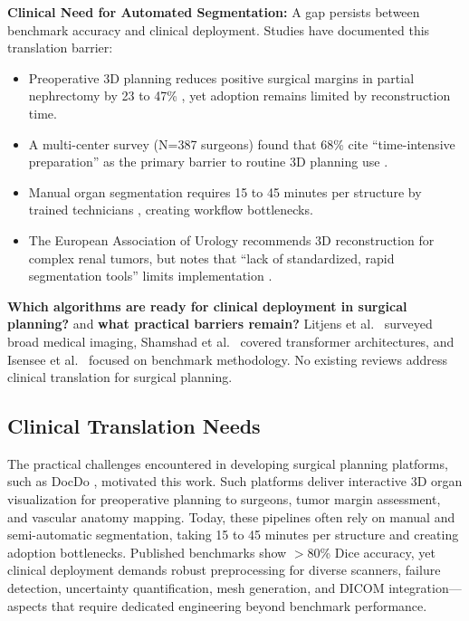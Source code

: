 \documentclass[conference]{IEEEtran}
\begin{document}
\textbf{Clinical Need for Automated Segmentation:} A gap persists between benchmark accuracy and clinical deployment. Studies have documented this translation barrier:
\begin{itemize}
    \item Preoperative 3D planning reduces positive surgical margins in partial nephrectomy by 23 to 47\% \cite{porpiglia2018three}, yet adoption remains limited by reconstruction time.
    \item A multi-center survey (N=387 surgeons) found that 68\% cite ``time-intensive preparation'' as the primary barrier to routine 3D planning use \cite{simpfendorfer2016surgeon}.
    \item Manual organ segmentation requires 15 to 45 minutes per structure by trained technicians \cite{sharma2010automated}, creating workflow bottlenecks.
    \item The European Association of Urology recommends 3D reconstruction for complex renal tumors, but notes that ``lack of standardized, rapid segmentation tools'' limits implementation \cite{eau2023guidelines}.
\end{itemize}

\textbf{Which algorithms are ready for clinical deployment in surgical planning?}  and \textbf{what practical barriers remain?} Litjens et al.\ \cite{litjens2017survey} surveyed broad medical imaging, Shamshad et al.\ \cite{shamshad2023transformers} covered transformer architectures, and Isensee et al.\ \cite{isensee2021nnunet} focused on benchmark methodology. No existing reviews address clinical translation for surgical planning.

\subsection{Clinical Translation Needs}

The practical challenges encountered in developing surgical planning platforms, such as DocDo \cite{docdo2026}, motivated this work. Such platforms deliver interactive 3D organ visualization for preoperative planning to surgeons, tumor margin assessment, and vascular anatomy mapping. Today, these pipelines often rely on manual and semi-automatic segmentation, taking 15 to 45 minutes per structure and creating adoption bottlenecks. Published benchmarks show $>$80\% Dice accuracy, yet clinical deployment demands robust preprocessing for diverse scanners, failure detection, uncertainty quantification, mesh generation, and DICOM integration---aspects that require dedicated engineering beyond benchmark performance.
\end{document}

